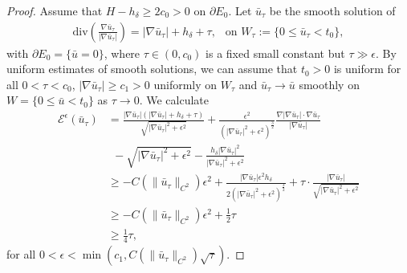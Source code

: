 \documentclass[11pt, letterpaper]{amsart}
\theoremstyle{definition}
\theoremstyle{remark}
\begin{document}
\begin{proof}
	Assume that $H - h_{\delta } \geq 2c_0>0$ on $\partial E_0$. Let $\bar{u}_{\tau }$ be the smooth solution of
\begin{align*}
	\mathrm{div}\left( \frac{\nabla \bar{u}_{\tau }}{|\nabla \bar{u}_{\tau }|} \right) = |\nabla \bar{u}_{\tau }| + h_{\delta }+ \tau ,\ \ \text{ on } W_{\tau }:= \{0 \leq \bar{u}_{\tau } < t_0\} ,
\end{align*} 
with $\partial E_0 = \{ \bar{u} = 0\} $, where $\tau \in (0, c_0)$ is a fixed small constant but $\tau \gg \epsilon $. By uniform estimates of smooth solutions, we can assume that $t_0>0$ is uniform for all $0<\tau < c_0$, $|\nabla \bar{u}_{\tau }| \geq c_1>0$ uniformly on $W_{\tau }$ and $\bar{u}_{\tau } \to \bar{u}$ smoothly on $W = \{ 0\leq \bar{u}< t_0\} $ as  $\tau \to 0$. We calculate
	\begin{align*}
		\mathcal{E}^{\epsilon }(\bar{u}_{\tau })
		&= \frac{|\nabla \bar{u}_{\tau }| (|\nabla \bar{u}_{\tau }| + h_\delta + \tau  )}{\sqrt{|\nabla \bar{u}_\tau |^2 + \epsilon ^2} } + \frac{\epsilon ^2}{\left( |\nabla \bar{u}_\tau |^2 + \epsilon ^2 \right) ^{\frac{3}{2}}} \frac{\nabla |\nabla \bar{u}_\tau | \cdot \nabla \bar{u}_\tau }{|\nabla \bar{u}_\tau |} \\
		&\ \ - \sqrt{|\nabla \bar{u}_\tau |^2+ \epsilon ^2}  - \frac{h_\delta |\nabla \bar{u}_\tau |^2}{|\nabla \bar{u}_\tau |^2 + \epsilon ^2} \\
		&\geq -C(\|\bar{u}_{\tau }\|_{C^2}) \epsilon ^2 + \frac{|\nabla \bar{u}_\tau | \epsilon ^2 h_{\delta }}{2\left( |\nabla \bar{u}_\tau |^2 + \epsilon ^2 \right) ^{\frac{3}{2}}  } + \tau \cdot \frac{|\nabla \bar{u}_{\tau }|}{\sqrt{|\nabla \bar{u}_\tau |^2 + \epsilon ^2} } \\
		&\geq - C(\|\bar{u}_{\tau }\|_{C^2}) \epsilon ^2 + \frac{1}{2} \tau \\
		&\geq \frac{1}{4} \tau ,
	\end{align*} 
	for all $0<\epsilon < \min(c_1, C(\|\bar{u}_{\tau }\|_{C^2}) \sqrt{\tau } )$. 


\end{proof}
\end{document}

